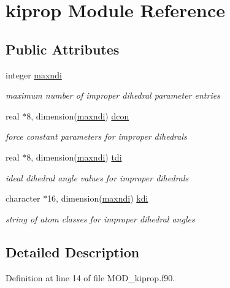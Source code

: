 \hypertarget{classkiprop}{\section{kiprop Module Reference}
\label{classkiprop}
}
\subsection*{Public Attributes}
\begin{DoxyCompactItemize}
\item 
integer \hyperlink{classkiprop_a7c337086f7a7e92eaa9d9a9eb3b740bd}{maxndi}
\begin{DoxyCompactList}\small\item\em maximum number of improper dihedral parameter entries \end{DoxyCompactList}\item 
real $\ast$8, dimension(\hyperlink{classkiprop_a7c337086f7a7e92eaa9d9a9eb3b740bd}{maxndi}) \hyperlink{classkiprop_a37e79afe78e774e81f1ee437155d8957}{dcon}
\begin{DoxyCompactList}\small\item\em force constant parameters for improper dihedrals \end{DoxyCompactList}\item 
real $\ast$8, dimension(\hyperlink{classkiprop_a7c337086f7a7e92eaa9d9a9eb3b740bd}{maxndi}) \hyperlink{classkiprop_a2f3ca3785e86b7c9e293b908a977af8d}{tdi}
\begin{DoxyCompactList}\small\item\em ideal dihedral angle values for improper dihedrals \end{DoxyCompactList}\item 
character $\ast$16, dimension(\hyperlink{classkiprop_a7c337086f7a7e92eaa9d9a9eb3b740bd}{maxndi}) \hyperlink{classkiprop_a1bbbb58d4b6e5fd8b7dfaaa35a6b03f8}{kdi}
\begin{DoxyCompactList}\small\item\em string of atom classes for improper dihedral angles \end{DoxyCompactList}\end{DoxyCompactItemize}


\subsection{Detailed Description}


Definition at line 14 of file M\-O\-D\-\_\-kiprop.\-f90.



